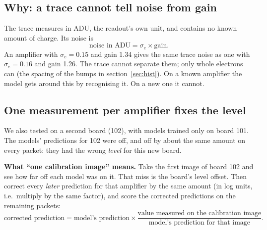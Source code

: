\documentclass[11pt]{article}
\begin{document}
\subsection{Why: a trace cannot tell noise from gain}
The trace measures in ADU, the readout's own unit, and contains no known amount of charge. Its noise is
\[\text{noise in ADU}=\sigma_e\times\text{gain}.\]
An amplifier with $\sigma_e=0.15$ and gain 1.34 gives the same trace noise as one with $\sigma_e=0.16$ and gain 1.26.
The trace cannot separate them; only whole electrons can (the spacing of the bumps in section~\ref{sec:hist}). On a known
amplifier the model gets around this by recognising it. On a new one it cannot.

\subsection{One measurement per amplifier fixes the level}
We also tested on a second board (102), with models trained only on board 101. The models' predictions for 102 were
off, and off by about the same amount on every packet: they had the wrong \emph{level} for this new board.

\textbf{What ``one calibration image'' means.} Take the first image of board 102 and see how far off each model was
on it. That miss is the board's level offset. Then correct every \emph{later} prediction for that amplifier by the
same amount (in log units, i.e.\ multiply by the same factor), and score the corrected predictions on the remaining
packets:
\[\text{corrected prediction}=\text{model's prediction}\times\frac{\text{value measured on the calibration image}}{\text{model's prediction for that image}}.\]
\end{document}
